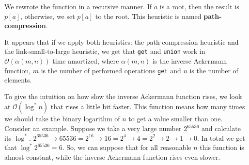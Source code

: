 \documentclass[11pt]{article}
\begin{document}
We rewrote the function in a recursive manner. If \(a\) is a root, then the result is \(p[a]\),
otherwise, we set \(p[a]\) to the root. This heuristic is named \textbf{path-compression}.

It appears that if we apply both heuristics: the path-compression heuristic and the
link-small-to-large heuristic, we get that \texttt{get} and \texttt{union} work in \(\mathcal{O}(\alpha(m, n))\)
time amortized, where \(\alpha(m, n)\) is the inverse Ackermann function, \(m\) is the number of
performed operations \texttt{get} and \(n\) is the number of elements.

To give the intuition on how slow the inverse Ackermann function rises, we look at
\(\mathcal{O}(\log^* n)\) that rises a little bit faster. This function means how many times we
should take the binary logarithm of \(n\) to get a value smaller than one. Consider an
example. Suppose we take a very large number \(2^{65536}\) and calculate its \(\log^*\). \(2^{65536}
  \rightarrow 65536=2^{16} \rightarrow 16=2^4 \rightarrow 4 = 2^2 \rightarrow 2 \rightarrow 1
  \rightarrow 0\). In total we get that \(\log^* 2^{65536} = 6\). So, we can suppose that for all
reasonable \(n\) this function is almost constant, while the inverse Ackermann function rises even
slower.
\end{document}

